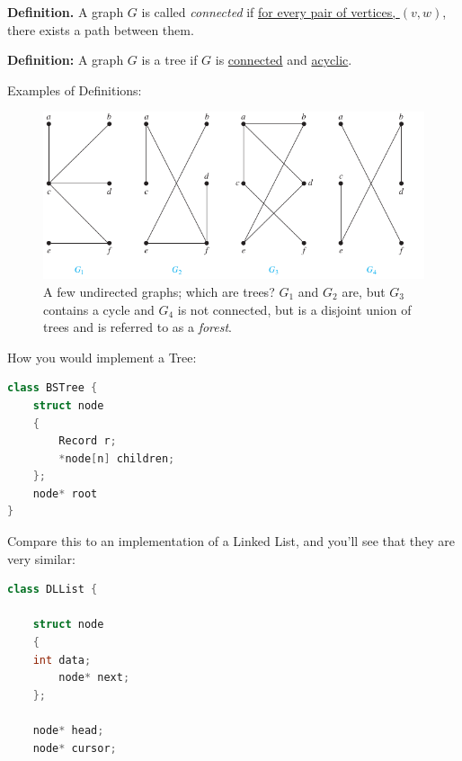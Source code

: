 \documentclass[a4paper,10pt]{report}
\begin{document}
\textbf{Definition.} A graph $G$ is called \textit{connected} if \underline{for every pair of vertices, $(v,w)$}, there exists a path between them.

\textbf{Definition:}  A graph $G$ is a tree if $G$ is \underline{connected} and \underline{acyclic}.

\hrulefill

Examples of Definitions:
\begin{figure}[H]
	\begin{centering}
	\begin{center}
	\includegraphics[width=\linewidth]{./Pictures/some_trees.png}
	\caption{A few undirected graphs; which are trees? $G_1$ and $G_2$ are, but $G_3$ contains a cycle and $G_4$ is not connected, but is a disjoint union of trees and is referred to as a \textit{forest}.}
	\label{fig:some_trees}
	\end{center}
	\par\end{centering}
\end{figure}

\newpage
How you would implement a Tree:
\begin{lstlisting}[language=C++]
class BSTree {
    struct node
    {
        Record r;
        *node[n] children;
    };
	node* root
}
\end{lstlisting}

Compare this to an implementation of a Linked List, and you'll see that they are very similar:
\begin{lstlisting}[language=C++]
class DLList {

    struct node
    {
	int data;
        node* next;
    };

    node* head;
    node* cursor;
\end{lstlisting}
\end{document}
